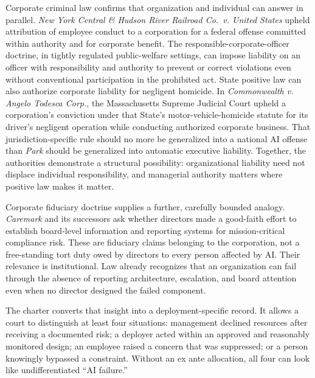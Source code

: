 Corporate criminal law confirms that organization and individual can answer in parallel. \emph{New York Central \& Hudson River Railroad Co.\ v. United States} upheld attribution of employee conduct to a corporation for a federal offense committed within authority and for corporate benefit. The responsible-corporate-officer doctrine, in tightly regulated public-welfare settings, can impose liability on an officer with responsibility and authority to prevent or correct violations even without conventional participation in the prohibited act. State positive law can also authorize corporate liability for negligent homicide. In \emph{Commonwealth v. Angelo Todesca Corp.}, the Massachusetts Supreme Judicial Court upheld a corporation's conviction under that State's motor-vehicle-homicide statute for its driver's negligent operation while conducting authorized corporate business. That jurisdiction-specific rule should no more be generalized into a national AI offense than \emph{Park} should be generalized into automatic executive liability. Together, the authorities demonstrate a structural possibility: organizational liability need not displace individual responsibility, and managerial authority matters where positive law makes it matter.

Corporate fiduciary doctrine supplies a further, carefully bounded analogy. \emph{Caremark} and its successors ask whether directors made a good-faith effort to establish board-level information and reporting systems for mission-critical compliance risk. These are fiduciary claims belonging to the corporation, not a free-standing tort duty owed by directors to every person affected by AI. Their relevance is institutional. Law already recognizes that an organization can fail through the absence of reporting architecture, escalation, and board attention even when no director designed the failed component.

The charter converts that insight into a deployment-specific record. It allows a court to distinguish at least four situations: management declined resources after receiving a documented risk; a deployer acted within an approved and reasonably monitored design; an employee raised a concern that was suppressed; or a person knowingly bypassed a constraint. Without an ex ante allocation, all four can look like undifferentiated ``AI failure.''

